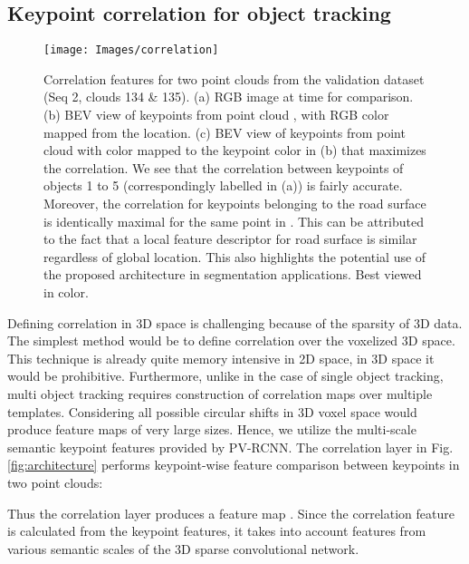 \documentclass[10pt,twocolumn,letterpaper]{article}
\begin{document}
\subsection{Keypoint correlation for object tracking}\label{sec:method:keypoint_corr}
\begin{figure*}
   \begin{center}
   \texttt{[image: Images/correlation]}
\end{center}
      \caption{Correlation features for two point clouds from the validation dataset (Seq 2, clouds 134 \& 135). (a) RGB image at time  for comparison. (b) BEV view of keypoints from point cloud , with RGB color mapped from the  location. (c) BEV view of keypoints from point cloud  with color mapped to the keypoint color in (b) that maximizes the correlation. We see that the correlation between keypoints of objects 1 to 5 (correspondingly labelled in (a)) is fairly accurate. Moreover, the correlation for keypoints belonging to the road surface is identically maximal for the same point in . This can be attributed to the fact that a local feature descriptor for road surface is similar regardless of global location. This also highlights the potential use of the proposed architecture in segmentation applications. Best viewed in color.}
   \label{fig:correlation}
\end{figure*}

Defining correlation in 3D space is challenging because of the sparsity of 3D data. The simplest method would be to define correlation over the voxelized 3D space. This technique is already quite memory intensive in 2D space, in 3D space it would be prohibitive. Furthermore, unlike in the case of single object tracking, multi object tracking requires construction of correlation maps over multiple templates. Considering all possible circular shifts in 3D voxel space would produce feature maps of very large sizes. Hence, we utilize the multi-scale semantic keypoint features  provided by PV-RCNN. The correlation layer in Fig. \ref{fig:architecture} performs keypoint-wise feature comparison between keypoints in two point clouds:

Thus the correlation layer produces a feature map . Since the correlation feature is calculated from the keypoint features, it takes into account features from various semantic scales of the 3D sparse convolutional network.
\end{document}
